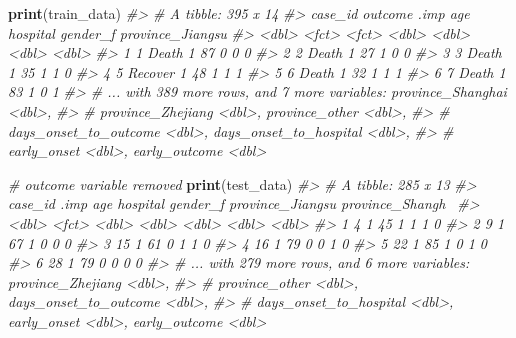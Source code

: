 \documentclass[]{book}
\newenvironment{Shaded}{\begin{snugshade}}{\end{snugshade}}
\newcommand{\CommentTok}[1]{\textcolor[rgb]{0.56,0.35,0.01}{\textit{#1}}}
\newcommand{\DecValTok}[1]{\textcolor[rgb]{0.00,0.00,0.81}{#1}}
\newcommand{\KeywordTok}[1]{\textcolor[rgb]{0.13,0.29,0.53}{\textbf{#1}}}
\newcommand{\NormalTok}[1]{#1}
\newcommand{\OperatorTok}[1]{\textcolor[rgb]{0.81,0.36,0.00}{\textbf{#1}}}
\newcommand{\StringTok}[1]{\textcolor[rgb]{0.31,0.60,0.02}{#1}}
\begin{document}
\begin{Shaded}
\end{Shaded}

\begin{Shaded}
\begin{Highlighting}[]
\KeywordTok{print}\NormalTok{(train_data)}
\CommentTok{#> # A tibble: 395 x 14}
\CommentTok{#>   case_id outcome .imp    age hospital gender_f province_Jiangsu}
\CommentTok{#>     <dbl> <fct>   <fct> <dbl>    <dbl>    <dbl>            <dbl>}
\CommentTok{#> 1       1 Death   1        87        0        0                0}
\CommentTok{#> 2       2 Death   1        27        1        0                0}
\CommentTok{#> 3       3 Death   1        35        1        1                0}
\CommentTok{#> 4       5 Recover 1        48        1        1                1}
\CommentTok{#> 5       6 Death   1        32        1        1                1}
\CommentTok{#> 6       7 Death   1        83        1        0                1}
\CommentTok{#> # ... with 389 more rows, and 7 more variables: province_Shanghai <dbl>,}
\CommentTok{#> #   province_Zhejiang <dbl>, province_other <dbl>,}
\CommentTok{#> #   days_onset_to_outcome <dbl>, days_onset_to_hospital <dbl>,}
\CommentTok{#> #   early_onset <dbl>, early_outcome <dbl>}
\end{Highlighting}
\end{Shaded}

\begin{Shaded}
\begin{Highlighting}[]
\CommentTok{# outcome variable removed}
\KeywordTok{print}\NormalTok{(test_data)}
\CommentTok{#> # A tibble: 285 x 13}
\CommentTok{#>   case_id .imp    age hospital gender_f province_Jiangsu province_Shangh~}
\CommentTok{#>     <dbl> <fct> <dbl>    <dbl>    <dbl>            <dbl>            <dbl>}
\CommentTok{#> 1       4 1        45        1        1                1                0}
\CommentTok{#> 2       9 1        67        1        0                0                0}
\CommentTok{#> 3      15 1        61        0        1                1                0}
\CommentTok{#> 4      16 1        79        0        0                1                0}
\CommentTok{#> 5      22 1        85        1        0                1                0}
\CommentTok{#> 6      28 1        79        0        0                0                0}
\CommentTok{#> # ... with 279 more rows, and 6 more variables: province_Zhejiang <dbl>,}
\CommentTok{#> #   province_other <dbl>, days_onset_to_outcome <dbl>,}
\CommentTok{#> #   days_onset_to_hospital <dbl>, early_onset <dbl>, early_outcome <dbl>}
\end{Highlighting}
\end{Shaded}
\end{document}
